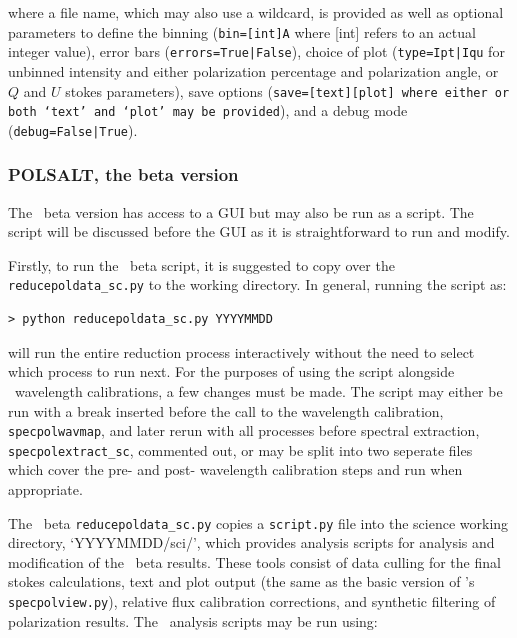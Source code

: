\noindent where a file name, which may also use a wildcard, is provided as well as optional para\-meters to define the binning (\texttt{bin=[int]A} where [int] refers to an actual integer value), error bars (\texttt{errors=True|False}), choice of plot (\texttt{type=Ipt|Iqu} for unbinned intensity and either polarization percentage and polarization angle, or $Q$ and $U$ stokes parameters), save options (\texttt{save=[text][plot] where either or both `text' and `plot' may be provided}), and a debug mode (\texttt{debug=False|True}).


\subsubsection{POLSALT, the beta version}

The \polsalt\ beta version has access to a \gls{GUI} but may also be run as a script. The script will be discussed before the \gls{GUI} as it is straightforward to run and modify.
\prgph

Firstly, to run the \polsalt\ beta script, it is suggested to copy over the \texttt{reducepol\-data\_sc.py} to the working directory. In general, running the script as:

\begin{verbatim}> python reducepoldata_sc.py YYYYMMDD\end{verbatim}

\noindent will run the entire reduction process interactively without the need to select which process to run next. For the purposes of using the script alongside \iraf\ wavelength calibrations, a few changes must be made. The script may either be run with a break inserted before the call to the wavelength calibration, \texttt{specpolwavmap}, and later rerun with all processes before spectral extraction, \texttt{specpolextract\_sc}, commented out, or may be split into two seperate files which cover the pre- and post- wavelength calibration steps and run when appropriate.
\prgph

The \polsalt\ beta \texttt{reducepoldata\_sc.py} copies a \texttt{script.py} file into the science working directory, `YYYYMMDD/sci/', which provides analysis scripts for analysis and modification of the \polsalt\ beta results. These tools consist of data culling for the final stokes calculations, text and plot output (the same as the basic version of \polsalt's \texttt{specpolview.py}), relative flux calibration corrections, and synthetic filtering of polarization results. The \polsalt\ analysis scripts may be run using:


